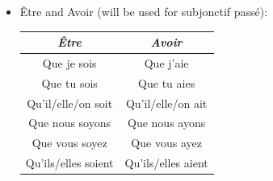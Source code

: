 \documentclass{book}
\begin{document}
\begin{enumerate}
\begin{itemize}
                    \item Être and Avoir (will be used for subjonctif passé):
                        \begin{center}
                            \begin{tabular}{|c|c|}
                                \hline
                                \textit{Être} & \textit{Avoir} \\
                                \hline
                                Que je sois & Que j'aie \\
                                \hline
                                Que tu sois & Que tu aies \\
                                \hline
                                Qu'il/elle/on soit & Qu'il/elle/on ait \\
                                \hline
                                Que nous soyons & Que nous ayons \\
                                \hline
                                Que vous soyez & Que vous ayez \\
                                \hline
                                Qu'ils/elles soient & Qu'ils/elles aient \\
                                \hline
                            \end{tabular}
                        \end{center}
                \end{itemize}
        \end{enumerate}
\end{document}
